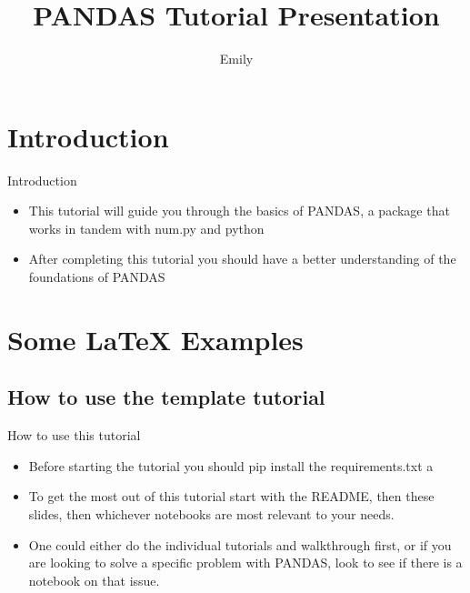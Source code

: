 \documentclass{beamer}
\title[PANDAS Tutorial Presentation]{PANDAS Tutorial Presentation}
\author{Emily}
\begin{document}
\begin{frame}
  \titlepage
\end{frame}


\section{Introduction}

\begin{frame}{Introduction}

\begin{itemize}
  \item This tutorial will guide you through the basics of PANDAS, a package that works in tandem with num.py and python
  \item After completing this tutorial you should have a better understanding of the foundations of PANDAS
  
\end{itemize}


\end{frame}

\section{Some \LaTeX{} Examples}

\subsection{How to use the template tutorial}

\begin{frame}{How to use this tutorial}

\begin{itemize}
  \item Before starting the tutorial you should pip install the requirements.txt a
  \item To get the most out of this tutorial start with the README, then these slides, then whichever notebooks are most relevant to your needs. 
  \item One could either do the individual tutorials and walkthrough first, or if you are looking to solve a specific problem with  PANDAS, look to see if there is a notebook on that issue. 
\end{itemize}

\end{frame}
\end{document}
